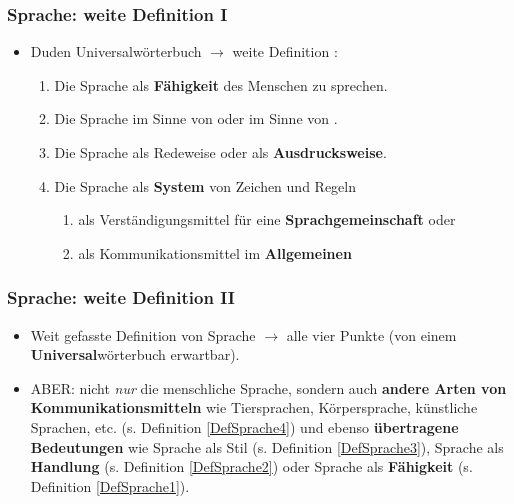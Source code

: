 \begin{frame}
\frametitle{Sprache: weite Definition I}

\begin{itemize}
	\item<1-> Duden Universalwörterbuch $\rightarrow$ weite Definition \citep[vgl.][]{Duden13a}:
	
	\begin{enumerate}
		\item<2->\label{DefSprache1} Die Sprache als \textbf{Fähigkeit} des Menschen zu sprechen.
		\item<3->\label{DefSprache2} Die Sprache im Sinne von  oder im Sinne von .
		\item<4->\label{DefSprache3} Die Sprache als Redeweise oder als \textbf{Ausdrucksweise}.
		\item<5->\label{DefSprache4} Die Sprache als \textbf{System} von Zeichen und Regeln

		\begin{enumerate}
			\item<5->\label{DefSprache4a} als Verständigungsmittel für eine \textbf{Sprachgemeinschaft} oder
			\item<5->\label{DefSprache4b} als Kommunikationsmittel im \textbf{Allgemeinen}
		\end{enumerate}
			
	\end{enumerate}
	
\end{itemize}

\end{frame}



\begin{frame}
\frametitle{Sprache: weite Definition II}
		
\begin{itemize}
	\item<1-> Weit gefasste Definition von Sprache $\rightarrow$ alle vier Punkte (von einem \textbf{Universal}wörterbuch erwartbar).
	\item<2-> ABER: nicht \textit{nur} die menschliche Sprache, sondern auch \textbf{andere Arten von Kommunikationsmitteln} wie Tiersprachen, Körpersprache, künstliche Sprachen, etc. (s. Definition \ref{DefSprache4}) und ebenso \textbf{übertragene Bedeutungen} wie Sprache als Stil (s. Definition 	\ref{DefSprache3}), Sprache als \textbf{Handlung} (s. Definition \ref{DefSprache2}) oder Sprache als \textbf{Fähigkeit} (s. Definition \ref{DefSprache1}).

\end{itemize}
		
\end{frame}


